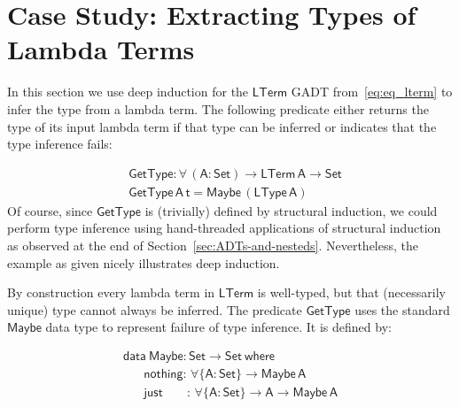 \documentclass[9pt]{entcs}
\begin{document}
\section{Case Study: Extracting Types of Lambda Terms}\label{sec:app}

In this section we use deep induction for the $\mathsf{LTerm}$ GADT
from~\eqref{eq:eq_lterm} to infer the type from a lambda term. The
following predicate either returns the type of its input lambda term
if that type can be inferred or indicates that the type inference
fails:

\vspace*{-0.3in}

\begin{align*}
  &\mathsf{GetType : \forall \, (A : Set) \to LTerm\,A \to Set} \\
  &\mathsf{GetType \,A \,t = Maybe \, (LType \, A)}
\end{align*}
Of course, since $\mathsf{GetType}$ is (trivially) defined by
structural induction, we could perform type inference using
hand-threaded applications of structural induction as observed at the
end of Section~\ref{sec:ADTs-and-nesteds}. Nevertheless, the example
as given nicely illustrates deep induction.

By construction every lambda term in $\mathsf{LTerm}$ is well-typed,
but that (necessarily unique) type cannot always be inferred.  The
predicate $\mathsf{GetType}$ uses the standard $\mathsf{Maybe}$ data
type to represent failure of type inference. It is defined
by:

\vspace*{-0.1in}

\begin{equation}\label{eq:maybe}
\begin{array}{l}
\mathsf{data\ Maybe : Set \to Set\ where}\\
\mathsf{\;\;\;\;\;\;nothing :\,  \forall \{A : Set\} \to Maybe\,A}\\
\mathsf{\;\;\;\;\;\;just\;\;\;\;\;\;\; :\,  \forall \{A : Set\} \to A \to Maybe\,A}
\end{array}
\end{equation}
\end{document}
